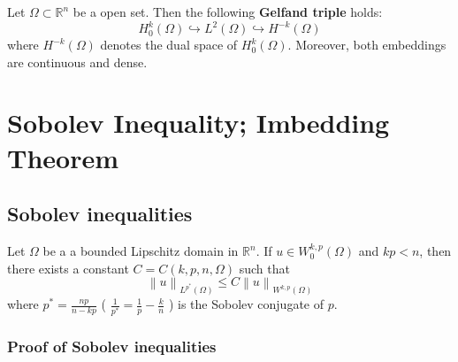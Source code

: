 \begin{theorem}
    Let $\Omega\subset \mathbb{R}^n$ be a open set.
    Then the following \textbf{Gelfand triple} holds:
    \begin{equation*}
        H_0^k\left(\Omega\right) \hookrightarrow L^2\left(\Omega\right) \hookrightarrow H^{-k}\left(\Omega\right)
    \end{equation*}
    where $H^{-k}\left(\Omega\right)$ denotes the dual space of $H_0^k\left(\Omega\right)$.
    Moreover, both embeddings are continuous and dense.
\end{theorem}









\chapter{Sobolev Inequality; Imbedding Theorem} %

\section{Sobolev inequalities}
\begin{theorem}
    Let $\Omega$ be a a bounded Lipschitz domain in $\mathbb{R}^n$.
    If $u \in W^{k, p}_0\left(\Omega\right)$ and $kp<n$, then there exists a constant $C=C\left(k,p,n,\Omega\right)$ such that
    \begin{equation*}
        \left\|u\right\|_{L^{p^*}\left(\Omega\right)}
        \leq
        C \left\|u\right\|_{W^{k, p}\left(\Omega\right)}
    \end{equation*}
    where $p^*=\frac{n p}{n-k p}$ ( $\frac{1}{p^*}=\frac{1}{p}-\frac{k}{n}$ ) is the Sobolev conjugate of $p$.
\end{theorem}





\subsection{Proof of Sobolev inequalities}

